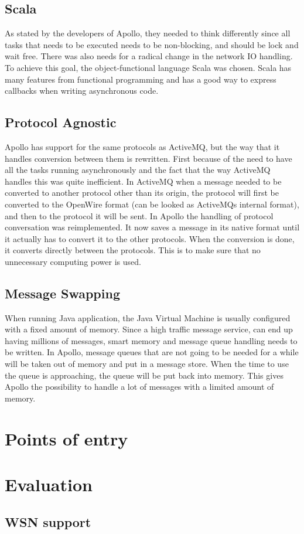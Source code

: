 \subsection{Scala}
As stated by the developers of Apollo, they needed to think differently since all tasks that needs to be executed needs to be non-blocking, and should be lock and wait free. There was also needs for a radical change in the network IO handling. To achieve this goal, the object-functional language Scala was chosen. Scala has many features from functional programming and has a good way to express callbacks when writing asynchronous code.

\subsection{Protocol Agnostic}
Apollo has support for the same protocols as ActiveMQ, but the way that it handles conversion between them is rewritten. First because of the need to have all the tasks running asynchronously and the fact that the way ActiveMQ handles this was quite inefficient. 
In ActiveMQ when a message needed to be converted to another protocol other than its origin, the protocol will first be converted to the OpenWire format (can be looked as ActiveMQs internal format), and then to the protocol it will be sent. 
In Apollo the handling of protocol conversation was reimplemented. It now saves a message in its native format until it actually has to convert it to the other protocols. When the conversion is done, it converts directly between the protocols. This is to make sure that no unnecessary computing power is used.

\subsection{Message Swapping}
When running Java application, the Java Virtual Machine is usually configured with a fixed amount of memory. Since a high traffic message service, can end up having millions of messages, smart memory and message queue handling needs to be written. 
In Apollo, message queues that are not going to be needed for a while will be taken out of memory and put in a message store. When the time to use the queue is approaching, the queue will be put back into memory. This gives Apollo the possibility to handle a lot of messages with a limited amount of memory.

\section{Points of entry}


\section{Evaluation}

\subsection{WSN support}

\clearpage
